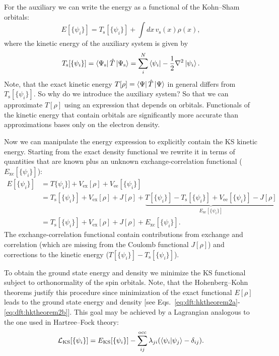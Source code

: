 \documentclass[../Main/chem532-notes.tex]{subfiles}
\begin{document}
For the auxiliary we can write the energy as a functional of the Kohn--Sham orbitals:
\begin{equation}
E[\{\psi_i\}] = T_\mathrm{s}[\{\psi_i\}] + \int dx \, v_\mathrm{s}(x) \rho(x),
\end{equation}
where the kinetic energy of the auxiliary system is given by
\begin{equation}
T_\mathrm{s}[\{\psi_i\}] = \bra{\Psi_\mathrm{s}} \hat{T} \ket{\Psi_\mathrm{s}}= \sum_i^N \bra{\psi_i} -\frac{1}{2}\nabla^2\ket{\psi_i}.
\end{equation}
Note, that the exact kinetic energy $T[\rho] = \bra{\Psi} \hat{T} \ket{\Psi}$ in general differs from $T_\mathrm{s}[\{\psi_i\}]$.
So why do we introduce the auxiliary system? So that we can approximate $T[\rho]$ using an expression that depends on orbitals.
Functionals of the kinetic energy that contain orbitals are significantly more accurate than approximations bases only on the electron density.

Now we can manipulate the energy expression to explicitly contain the KS kinetic energy. Starting from the exact density functional we rewrite it in terms of quantities that are known plus an unknown exchange-correlation functional ($E_\mathrm{xc}[\{\psi_i\}]$):
\begin{equation}
\begin{split}
E[\{\psi_i\}] & = T\{\psi_i\}] + V_\mathrm{ex}[\rho] + V_\mathrm{ee}[\{\psi_i\}] \\
& =  T_\mathrm{s}[\{\psi_i\}] + V_\mathrm{ex}[\rho] + J[\rho] +
\underbrace{T[\{\psi_i\}]- T_\mathrm{s}[\{\psi_i\}] + 
V_\mathrm{ee}[\{\psi_i\}]  - J[\rho] 
}_{E_\mathrm{xc}[\{\psi_i\}]} \\
& =  T_\mathrm{s}[\{\psi_i\}] + V_\mathrm{ex}[\rho] + J[\rho] + E_\mathrm{xc}[\{\psi_i\}].
\end{split}
\end{equation}
The exchange-correlation functional contain contributions from exchange and correlation (which are missing from the Coulomb functional $J[\rho]$) and corrections to the kinetic energy ($T[\{\psi_i\}]- T_\mathrm{s}[\{\psi_i\}]
$).

To obtain the ground state energy and density we minimize the KS functional subject to orthonormality of the spin orbitals.
Note, that the Hohenberg--Kohn theorems justify this procedure since minimization of the exact functional $E[\rho]$ leads to the ground state energy and density [see Eqs.~\eqref{eq:dft:hktheorem2a}-\eqref{eq:dft:hktheorem2b}].
This goal may be achieved by a Lagrangian analogous to the one used in Hartree--Fock theory:
\begin{equation}
\mathcal{L}_\mathrm{KS}[\{ \psi_i \}] = E_\mathrm{KS}[\{ \psi_i \}] - \sum_{ij}^\mathrm{occ} \lambda_{ji} (\braket{\psi_i|\psi_j} - \delta_{ij}).
\end{equation}
\end{document}
